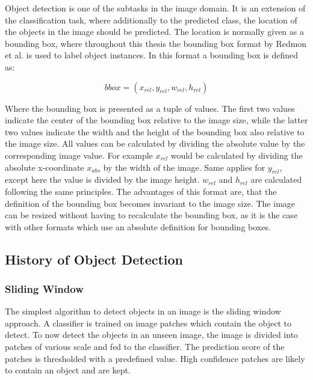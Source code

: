 Object detection is one of the subtasks in the image domain.
It is an extension of the classification task, where additionally to the predicted class, the location of the objects in the image should be predicted.
The location is normally given as a bounding box, where throughout this thesis the bounding box format by Redmon et al. \cite{yolov1} is used to label object instances.
In this format a bounding box is defined as:

\begin{equation}
    bbox = (x_{rel}, y_{rel}, w_{rel}, h_{rel})
\end{equation}

Where the bounding box is presented as a tuple of values.
The first two values indicate the center of the bounding box relative to the image size, while the latter two values indicate the width and the height of the bounding box also relative to the image size.
All values can be calculated by dividing the absolute value by the corresponding image value.
For example $x_{rel}$ would be calculated by dividing the absolute x-coordinate $x_{abs}$ by the width of the image.
Same applies for $y_{rel}$, except here the value is divided by the image height.
$w_{rel}$ and $h_{rel}$ are calculated following the same principles.
The advantages of this format are, that the definition of the bounding box becomes invariant to the image size.
The image can be resized without having to recalculate the bounding box, as it is the case with other formats which use an absolute definition for bounding boxes.

\subsection{History of Object Detection}
\label{sec:hostory_obj_detection}

\subsubsection{Sliding Window}
The simplest algorithm to detect objects in an image is the sliding window approach.
A classifier is trained on image patches which contain the object to detect.
To now detect the objects in an unseen image, the image is divided into patches of various scale and fed to the classifier.
The prediction score of the patches is thresholded with a predefined value.
High confidence patches are likely to contain an object and are kept. \cite{sliding_window_satelite}

